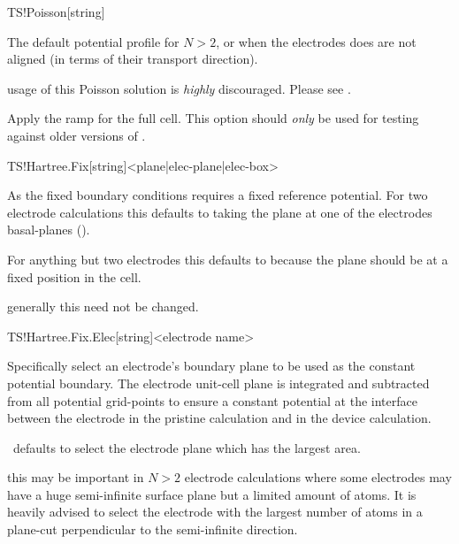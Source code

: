 \begin{fdfentry}{TS!Poisson}[string]
\begin{fdfoptions}
    

    The default potential profile for $N>2$, or when the electrodes
    does are not aligned (in terms of their transport direction).
    
    \note usage of this Poisson solution is \emph{highly}
    discouraged. Please see .


    Apply the ramp for the full cell. This option should \emph{only}
    be used for testing against older versions of \tsiesta.

  \end{fdfoptions}
  
\end{fdfentry}

\begin{fdfentry}{TS!Hartree.Fix}[string]<plane|elec-plane|elec-box>

  As the fixed boundary conditions requires a fixed reference
  potential. For two electrode calculations this defaults to taking
  the plane at one of the electrodes basal-planes (). 

  For anything but two electrodes this defaults to 
  because the plane should be at a fixed position in the cell. 

  \note generally this need not be changed.

\end{fdfentry}

\begin{fdfentry}{TS!Hartree.Fix.Elec}[string]<electrode name>

  Specifically select an electrode's boundary plane to be used as the
  constant potential boundary. The electrode unit-cell plane is
  integrated and subtracted from all potential grid-points to ensure a
  constant potential at the interface between the electrode in the
  pristine calculation and in the device calculation.

  \tsiesta\ defaults to select the electrode plane which has the
  largest area.

  \note this may be important in $N>2$ electrode calculations where
  some electrodes may have a huge semi-infinite surface plane but a
  limited amount of atoms. It is heavily advised to select the
  electrode with the largest number of atoms in a plane-cut
  perpendicular to the semi-infinite direction.

\end{fdfentry}

